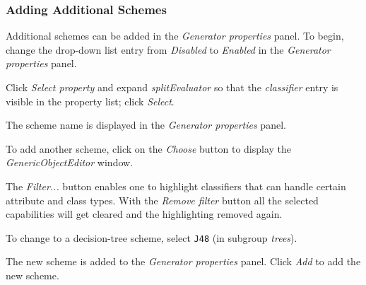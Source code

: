 \subsubsection*{Adding Additional Schemes}

Additional schemes can be added in the \textit{Generator properties} panel. To begin, change the drop-down list entry from \textit{Disabled} to \textit{Enabled} in the \textit{Generator properties} panel.
\begin{center}
\end{center}

Click \textit{Select property} and expand \textit{splitEvaluator} so that the \textit{classifier} entry is visible in the property list; click \textit{Select}.
\begin{center}
\end{center}

The scheme name is displayed in the \textit{Generator properties} panel.
\begin{center}
\end{center}

To add another scheme, click on the \textit{Choose} button to display the \textit{GenericObjectEditor} window.
\begin{center}
\end{center}

The \textit{Filter...} button enables one to highlight classifiers that can handle certain attribute and class types. With the \textit{Remove filter} button all the selected capabilities will get cleared and the highlighting removed again.

To change to a decision-tree scheme, select \texttt{J48} (in subgroup \textit{trees}).
\begin{center}
\end{center}

The new scheme is added to the \textit{Generator properties} panel. Click \textit{Add} to add the new scheme.
\begin{center}
\end{center}

